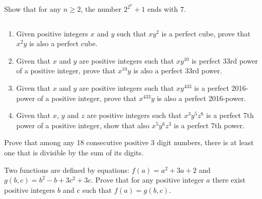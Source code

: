 \documentclass[problems.tex]{subfile}
\begin{document}
	\begin{problem}
		Show that for any $n\geq 2$, the number $2^{2^n}+1$ ends with $7$. %
	\end{problem}

	\begin{problem}
		$ $
		\begin{enumerate}
			\item Given positive integers $x$ and $y$ such that $xy^2$ is a perfect cube, prove that $x^2y$ is also a perfect cube. %
			\item Given that $x$ and $y$ are positive integers such that $xy^{10}$ is perfect 33rd power of a positive integer, prove that $x^{10}y$ is also a perfect 33rd power. %
			\item Given that $x$ and $y$ are positive integers such that $xy^{433}$ is a perfect 2016-power of a positive integer, prove that $x^{433}y$ is also a perfect 2016-power. %
			\item Given that $x$, $y$ and $z$ are positive integers such that $x^3y^5z^6$ is a perfect 7th power of a positive integer, show that also $x^5y^6z^3$ is a perfect 7th power. %
		\end{enumerate}
	\end{problem}

	\begin{problem}
		Prove that among any 18 consecutive positive $3$ digit numbers, there is at least one that is divisible by the sum of its digits. %
	\end{problem}

	\begin{problem}
		Two functions are defined by equations: $f(a) = a^2 + 3a + 2$ and $g(b, c) = b^2 - b + 3c^2 + 3c$. Prove that for any positive integer $a$ there exist positive integers $b$ and $c$ such that $f(a) = g(b, c)$. %
	\end{problem}
\end{document}
